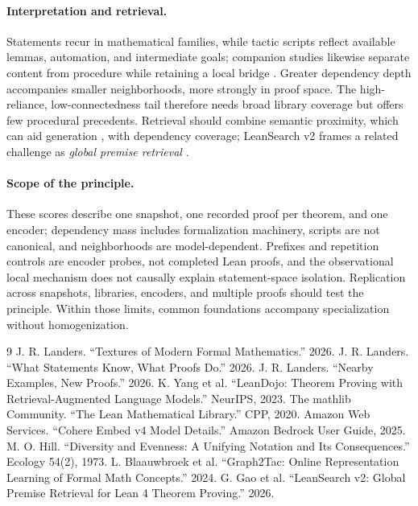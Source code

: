 \documentclass[11pt]{article}
\begin{document}
\paragraph{Interpretation and retrieval.}
Statements recur in mathematical families, while tactic scripts reflect available lemmas,
automation, and intermediate goals; companion studies likewise separate content from procedure
while retaining a local bridge \cite{textures,statements}.  Greater dependency depth accompanies
smaller neighborhoods, more strongly in proof space.  The high-reliance, low-connectedness tail
therefore needs broad library coverage but offers few procedural precedents.  Retrieval should
combine semantic proximity, which can aid generation \cite{nearby}, with dependency coverage;
LeanSearch v2 frames a related challenge as \emph{global premise retrieval} \cite{leansearchv2}.

\paragraph{Scope of the principle.}
These scores describe one snapshot, one recorded proof per theorem, and one encoder; dependency
mass includes formalization machinery, scripts are not canonical, and neighborhoods are
model-dependent.  Prefixes and repetition controls are encoder probes, not completed Lean proofs,
and the observational local mechanism does not causally explain statement-space isolation.
Replication across snapshots, libraries, encoders, and multiple proofs should test the principle.
Within those limits, common foundations accompany specialization without homogenization.

\clearpage
\begin{thebibliography}{9}
\setlength{\itemsep}{-2pt}
\setlength{\parskip}{0pt}
 J. R. Landers. ``Textures of Modern Formal Mathematics.'' 2026.
 J. R. Landers. ``What Statements Know, What Proofs Do.'' 2026.
 J. R. Landers. ``Nearby Examples, New Proofs.'' 2026.
 K. Yang et al. ``LeanDojo: Theorem Proving with Retrieval-Augmented Language Models.'' NeurIPS, 2023.
 The mathlib Community. ``The Lean Mathematical Library.'' CPP, 2020.
 Amazon Web Services. ``Cohere Embed v4 Model Details.'' Amazon Bedrock User Guide, 2025.
 M. O. Hill. ``Diversity and Evenness: A Unifying Notation and Its Consequences.'' Ecology 54(2), 1973.
 L. Blaauwbroek et al. ``Graph2Tac: Online Representation Learning of Formal Math Concepts.'' 2024.
 G. Gao et al. ``LeanSearch v2: Global Premise Retrieval for Lean 4 Theorem Proving.'' 2026.
\end{thebibliography}
\end{document}
